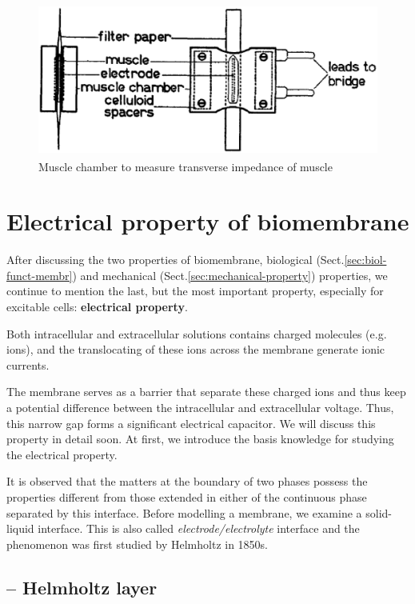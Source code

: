 \begin{figure}[hbt]
  \centerline{\includegraphics[height=5cm,
    angle=0]{./images/impedance-method.eps}}
  \caption{Muscle chamber to measure transverse impedance of muscle}
  \label{fig:impedance-method}
\end{figure}


\section{Electrical property of biomembrane}
\label{sec:electrical-property-biomembrane}

After discussing the two properties of biomembrane, biological
(Sect.\ref{sec:biol-funct-membr}) and mechanical
(Sect.\ref{sec:mechanical-property}) properties, we continue to mention the
last, but the most important property, especially for excitable cells:
{\bf electrical property}. 

Both intracellular and extracellular solutions contains charged molecules
(e.g. ions), and the translocating of these ions across the membrane generate
ionic currents. 

The membrane serves as a barrier that separate these charged ions and thus keep
a potential difference between the intracellular and extracellular voltage.
Thus, this narrow gap forms a significant electrical capacitor. We will discuss
this property in detail soon. At first, we introduce the basis knowledge for
studying the electrical property.

It is observed that the matters at the boundary of two phases possess
the properties different from those extended in either of the
continuous phase separated by this interface.  Before modelling a
membrane, we examine a solid-liquid interface.  This is also called
{\it electrode/electrolyte} interface and the phenomenon was first
studied by Helmholtz in 1850s.

\subsection{-- Helmholtz layer}
\label{sec:helmholtz-layer}


